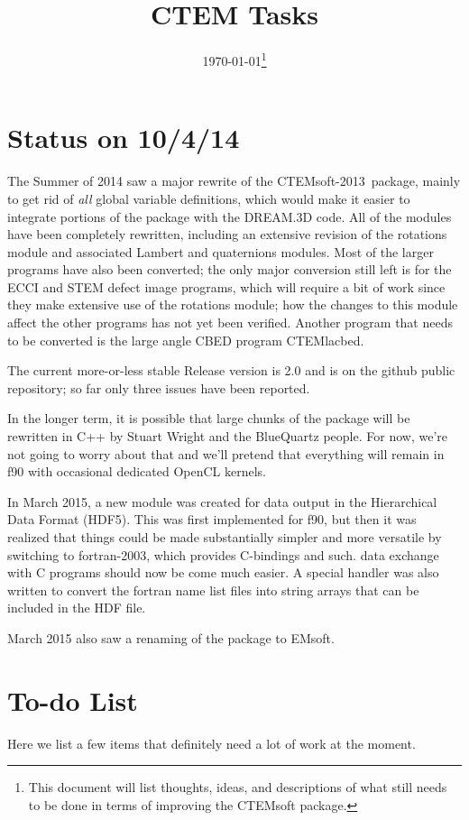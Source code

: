 \documentclass[DIV=calc, paper=letter, fontsize=11pt]{scrartcl}	 %
\title{CTEM Tasks} %
\author{\vspace*{-0.7in}} %
\date{\today\protect\footnote{This document will list thoughts, ideas, and descriptions of what still needs to be done in terms of improving the CTEMsoft package.}}
\newcommand{\ctp}{\textsf{CTEMsoft-2013}}
\begin{document}
\maketitle
\renewcommand{\contentsname}{Table of Contents}
{\small\tableofcontents}

\newpage
\section{Status on 10/4/14}
The Summer of 2014 saw a major rewrite of the \ctp\ package, mainly to get rid of \textit{all} global variable 
definitions, which would make it easier to integrate portions of the package with the DREAM.3D code.  All of the 
modules have been completely rewritten, including an extensive revision of the \textsf{rotations} module and 
associated \textsf{Lambert} and \textsf{quaternions} modules.  Most of the larger programs have also been converted;
the only major conversion still left is for the ECCI and STEM defect image programs, which will require a bit of 
work since they make extensive use of the rotations module; how the changes to this module affect the other 
programs has not yet been verified.  Another program that needs to be converted is the large angle CBED program CTEMlacbed.

The current more-or-less stable Release version is 2.0 and is on the github public repository; so far only three issues have
been reported.

In the longer term, it is possible that large chunks of the package will be rewritten in C++ by Stuart Wright and the BlueQuartz people.
For now, we're not going to worry about that and we'll pretend that everything will remain in f90 with occasional dedicated OpenCL kernels.

In March 2015, a new module was created for data output in the Hierarchical Data Format (HDF5).  This was first implemented
for f90, but then it was realized that things could be made substantially simpler and more versatile by switching to fortran-2003,
which provides C-bindings and such.  data exchange with C programs should now be come much easier.  A special handler was
also written to convert the fortran name list files into string arrays that can be included in the HDF file.

March 2015 also saw a renaming of the package to \textsf{EMsoft}. 


\section{To-do List}
Here we list a few items that definitely need a lot of work at the moment.
\end{document}
